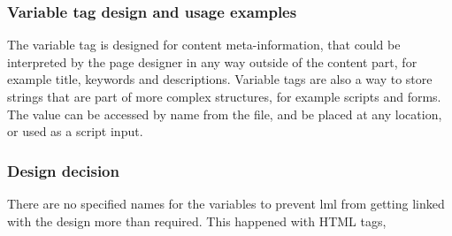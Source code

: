 \documentclass[12pt,a4paper]{article}
\begin{document}
\begin{tcolorbox}
\subsubsection*{Variable tag design and usage examples}
The variable tag is designed for content meta-information, that could be interpreted by the page designer in any way outside of the content part, for example title, keywords and descriptions. Variable tags are also a way to store strings that are part of more complex structures, for example scripts and forms. The value can be accessed by name from the file, and be placed at any location, or used as a script input.

\subsubsection*{Design decision}
There are no specified names for the variables to prevent lml from getting linked with the design more than required. This happened with HTML tags, 
\end{tcolorbox}
\end{document}
